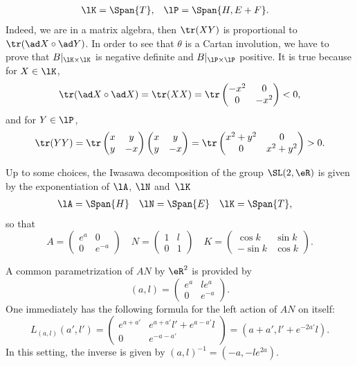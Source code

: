 \begin{align}
   \lK&=\Span\{ T \},
&\lP&=\Span\{ H,E+F \}.
\end{align}
Indeed, we are in a matrix algebra, then $\tr(XY)$ is proportional to $\tr(\ad X\circ \ad Y)$.
 In order to see that $\theta$ is a Cartan involution, we have to prove that $B|_{\lK\times\lK}$ is negative definite and $B|_{\lP\times\lP}$ positive. It is true because for $X\in\lK$,
\[
    \tr(\ad X\circ \ad X)=\tr(XX)=\tr\begin{pmatrix}
-x^2 & 0 \\
0 & -x^2
\end{pmatrix}<0,
\]
and for $Y\in\lP$,
\[
    \tr(YY)=\tr\begin{pmatrix}
x & y \\
y & -x
\end{pmatrix}\begin{pmatrix}
x & y \\
y & -x
\end{pmatrix} =\tr\begin{pmatrix}
x^2+y^2 & 0 \\
0 & x^2+y^2
\end{pmatrix} >0.
\]

Up to some choices, the Iwasawa decomposition\label{pg_iwasldr} of the group $\SL(2,\eR)$ is given by the exponentiation of $\lA$, $\lN$ and~$\lK$
\begin{equation}
\begin{aligned}
  \lA&=\Span\{ H \}
&\lN&=\Span\{ E \}
&\lK&=\Span\{T\},
\end{aligned}
\end{equation}
so that
\begin{equation}\label{eq:expo_ANK}
A=\begin{pmatrix}
e^a & 0 \\
0 & e^{-a}
\end{pmatrix}\quad
N=\begin{pmatrix}
1 & l \\
0 & 1
\end{pmatrix}\quad
K=\begin{pmatrix}
\cos k & \sin k \\
-\sin k & \cos k
\end{pmatrix}.
\end{equation}

A common parametrization of $AN$ by $\eR^2$ is provided by
\begin{equation}   \label{EqParmalSL} 
(a,l)=
\begin{pmatrix}
  e^a&le^a\\
  0  &e^{-a}
\end{pmatrix}.
\end{equation}
One immediately has the following formula for the left action of $AN$ on itself:
\[
  L_{(a,l)}(a',l')=\begin{pmatrix}
e^{a+a'} & e^{a+a'}l'+e^{a-a'}l \\
0 & e^{-a-a'}
\end{pmatrix}=(a+a',l'+e^{-2a'}l).
\]
In this setting, the inverse is given by $(a,l)^{-1}=(-a,-l e^{2a})$.  

